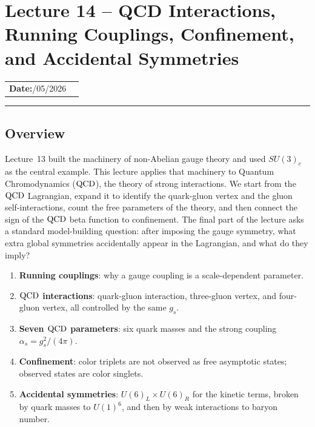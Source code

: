 \documentclass[../main.tex]{subfiles}
\begin{document}
\section{Lecture 14 -- QCD Interactions, Running Couplings, Confinement, and Accidental Symmetries}\label{sec:lec14}
\begin{center}
\begin{tabular}{ll}
  \textbf{Date:}\quad 31/05/2026 & \\
\end{tabular}
\end{center}
\hrule\vspace{1.5em}

\subsection*{Overview}

Lecture~13 built the machinery of non-Abelian gauge theory and used $SU(3)_c$ as the central example. This lecture applies that machinery to Quantum Chromodynamics ($\mathrm{QCD}$), the theory of strong interactions. We start from the $\mathrm{QCD}$ Lagrangian, expand it to identify the quark-gluon vertex and the gluon self-interactions, count the free parameters of the theory, and then connect the sign of the $\mathrm{QCD}$ beta function to confinement. The final part of the lecture asks a standard model-building question: after imposing the gauge symmetry, what extra global symmetries accidentally appear in the Lagrangian, and what do they imply?

\begin{enumerate}
  \item \textbf{Running couplings}: why a gauge coupling is a scale-dependent parameter.
  \item \textbf{$\mathrm{QCD}$ interactions}: quark-gluon interaction, three-gluon vertex, and four-gluon vertex, all controlled by the same $g_s$.
  \item \textbf{Seven $\mathrm{QCD}$ parameters}: six quark masses and the strong coupling $\alpha_s=g_s^2/(4\pi)$.
  \item \textbf{Confinement}: color triplets are not observed as free asymptotic states; observed states are color singlets.
  \item \textbf{Accidental symmetries}: $U(6)_L\times U(6)_R$ for the kinetic terms, broken by quark masses to $U(1)^6$, and then by weak interactions to baryon number.
\end{enumerate}
\end{document}

